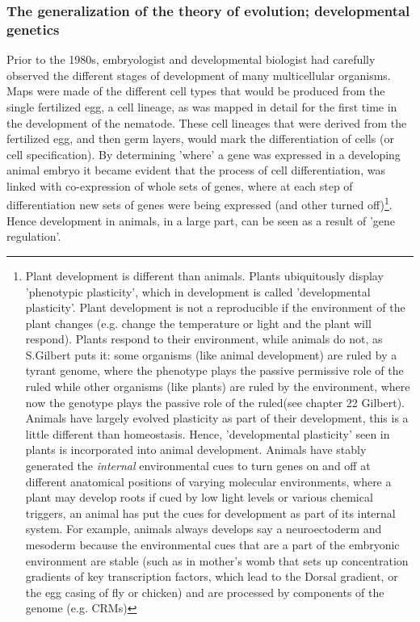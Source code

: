 \subsubsection{The generalization of the theory of evolution; developmental genetics}
Prior to the 1980s, embryologist and developmental biologist had carefully observed the different stages of development of many multicellular organisms.  Maps were made of the different cell types that would be produced from the single fertilized egg, a cell lineage, as was mapped in detail for the first time in the development of the nematode.  These cell lineages that were derived from the fertilized egg, and then germ layers, would mark the differentiation of cells (or cell specification).  By determining 'where' a gene was expressed in a developing animal embryo it became evident that the process of cell differentiation, was linked with co-expression of whole sets of genes, where at each step of differentiation new sets of genes were being expressed (and other turned off)\footnote{Plant development is different than animals.  Plants ubiquitously display 'phenotypic plasticity', which in development is called 'developmental plasticity'.  Plant development is not a reproducible if the environment of the plant changes (e.g. change the temperature or light and the plant will respond).  Plants respond to their environment, while animals do not, as S.Gilbert puts it: some organisms (like animal development) are ruled by a tyrant genome, where the phenotype plays the passive permissive role of the ruled while other organisms (like plants) are ruled by the environment, where now the genotype plays the passive role of the ruled(see chapter 22 Gilbert\cite{devogilbert}).  Animals have largely evolved plasticity as part of their development, this is a little different than homeostasis.  Hence, 'developmental plasticity' seen in plants is incorporated into animal development.  Animals have stably generated the \textit{internal} environmental cues to turn genes on and off at different anatomical positions of varying molecular environments, where a plant may develop roots if cued by low light levels or various chemical triggers, an animal has put the cues for development as part of its internal system.  For example, animals always develops say a neuroectoderm and mesoderm  because the environmental cues that are a part of the embryonic environment are stable (such as in mother's womb that sets up concentration gradients of key transcription factors, which lead to the Dorsal gradient, or the egg casing of fly or chicken) and are processed by components of the genome (e.g. CRMs)\cite{ecodevo}}.   Hence development in animals, in a large part, can be seen as a result of 'gene regulation'.
 
